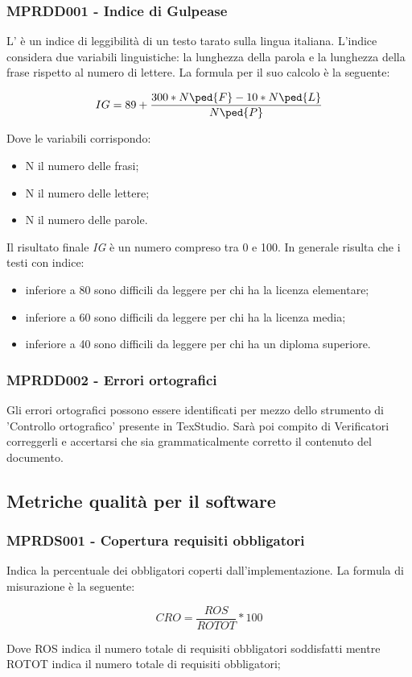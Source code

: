 {\subsubsection{MPRDD001 - Indice di Gulpease}
L' è un indice di leggibilità di un testo tarato sulla lingua italiana.
L'indice considera due variabili linguistiche: la lunghezza della parola e la lunghezza della frase rispetto al numero di lettere. La formula per il suo calcolo è la seguente:
\begin{center}
    \begin{displaymath}
        IG = 89 + {300 * N\ped{F} - 10 * N\ped{L} \over N\ped{P}}
    \end{displaymath}
\end{center}
Dove le variabili corrispondo:
\begin{itemize}
    \item N il numero delle frasi;
    \item N il numero delle lettere; 
    \item N il numero delle parole.
\end{itemize}
Il risultato finale  \emph{IG} è un numero compreso tra 0 e 100. In generale risulta che i testi con indice:
\begin{itemize}
    \item inferiore a 80 sono difficili da leggere per chi ha la licenza elementare;
    \item inferiore a 60 sono difficili da leggere per chi ha la licenza media;
    \item inferiore a 40 sono difficili da leggere per chi ha un diploma superiore.
\end{itemize}
\subsubsection{MPRDD002 - Errori ortografici}
Gli errori ortografici possono essere identificati per mezzo dello strumento di 'Controllo ortografico' presente in TexStudio. Sarà poi compito di Verificatori correggerli e accertarsi che sia grammaticalmente corretto il contenuto del documento.

\subsection{Metriche qualità per il software}
\label{sec:metriche_software}
\subsubsection{MPRDS001 - Copertura requisiti obbligatori}
Indica la percentuale dei  obbligatori coperti dall'implementazione. La formula di misurazione è la seguente:
\begin{center}
    \begin{displaymath}
        CRO = \frac{ROS}{ROTOT} * 100
    \end{displaymath}
\end{center}
Dove ROS indica il numero totale di requisiti obbligatori soddisfatti mentre ROTOT indica il numero totale di requisiti obbligatori;
}
